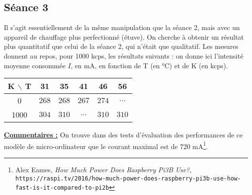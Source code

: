 \documentclass[french]{article}
\newcommand{\bs}{\xspace$\backslash$\xspace}
\begin{document}
\subsection{Séance 3}

Il s'agit essentiellement de la même manipulation que la séance 2, mais avec un appareil de chauffage plus perfectionné (étuve). On cherche à obtenir un résultat plus quantitatif que celui de la séance 2, qui n'était que qualitatif. Les mesures donnent au repos, pour 1000 kcps, les résultats suivants : on donne ici l'intensité moyenne consommée $I$, en mA, en fonction de T (en °C) et de K (en kcps).

\begin{table}[ht]
    \centering
    \begin{tabular}{|c|c|c|c|c|c|} \hline
    \textbf{K \bs T } &   31  &   35  &   41  &   46  &   56  \\ \hline
            0         &$ 268 $&$ 268 $&$ 267 $&$ 274 $&$ ... $\\ \hline
            1000      &$ 304 $&$ 310 $&$ ... $&$ 310 $&$ 310 $\\ \hline
    \end{tabular}
\end{table}

\underline{\textbf{Commentaires :}} On trouve dans des tests d'évaluation des performances de ce modèle de micro-ordinateur que le courant maximal est de 720 mA\footnote{Alex Eames, \textit{How Much Power Does Raspberry Pi3B Use?}, \texttt{https://raspi.tv/2016/how-much-power-does-raspberry-pi3b-use-how-fast-is-it-compared-to-pi2b}}.
\end{document}
